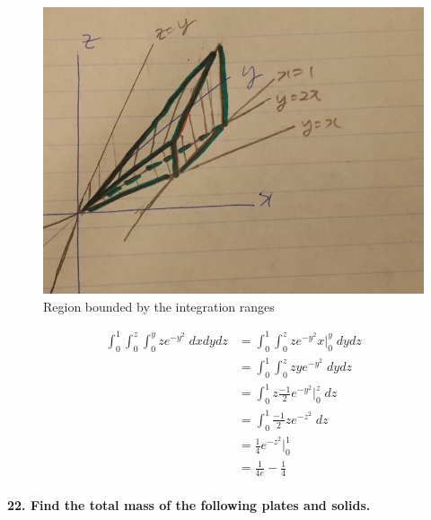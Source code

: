\documentclass{article}
\begin{document}
\begin{enumerate}
        \begin{figure}[H]
            \centering
            \includegraphics[width=0.75\columnwidth]{num21_2.JPG}
            \caption{Region bounded by the integration ranges}
            \label{fig:my_label}
        \end{figure}
        
\begin{align*}
    \int_0^1 \int_0^z \int_0^y z e^{-y^2} \; dx dy dz &= \int_0^1 \int_0^z z e^{-y^2}x\Bigr|_{0}^{y} \; dy dz \\
    &=\int_0^1 \int_0^z zy e^{-y^2}\; dy dz\\
    &=\int_0^1 z \frac{-1}{2}e^{-y^2}\Bigr|_{0}^{z}\; dz\\
    &=\int_0^1 \frac{-1}{2}ze^{-z^2}\; dz \\
    &= \frac{1}{4}e^{-z^2}\Bigr|_{0}^{1}\\
    &= \frac{1}{4e}-\frac{1}{4}
\end{align*}
    \end{enumerate}

\paragraph{22. Find the total mass of the following plates and solids.}
\end{document}
